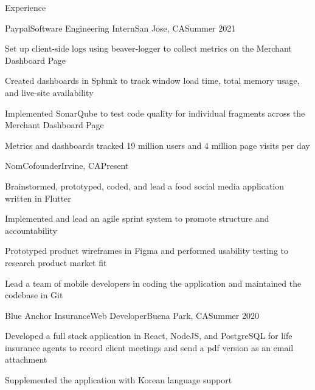 \documentclass{article}
\newlength{\tabin}
\newlength{\secsep}
\newcommand{\lineunder}{\vspace*{-8pt} \\ \hspace*{-6pt} \hrulefill \\ \vspace*{-15pt}}
\newenvironment{tabbedsection}[1]{
  \begin{list}{}{
      \setlength{\itemsep}{0pt}
      \setlength{\labelsep}{0pt}
      \setlength{\labelwidth}{0pt}
      \setlength{\leftmargin}{\tabin}
      \setlength{\rightmargin}{\tabin}
      \setlength{\listparindent}{0pt}
      \setlength{\parsep}{0pt}
      \setlength{\parskip}{0pt}
      \setlength{\partopsep}{0pt}
      \setlength{\topsep}{#1}
    }
  \item[]
}{\end{list}}
\newenvironment{resume_section}[1]{
  \filbreak
  \vspace{2\secsep}
  \textsc{\large#1}
  \lineunder
  \begin{tabbedsection}{\secsep}
}{\end{tabbedsection}}
\newenvironment{subitems}{
  \renewcommand{\labelitemi}{-}
  \begin{itemize}
      \setlength{\labelsep}{1em}
}{\end{itemize}}
\newenvironment{resume_employer}[4]{
  \vspace{\secsep}
  \textbf{#1} \\ 
  \indent {\small #2} \hfill {\footnotesize#3 (#4)}
  \begin{tabbedsection}{0pt}
  \begin{subitems}
}{\end{subitems}\end{tabbedsection}}
\begin{document}
\begin{resume_section}{Experience}
  \begin{resume_employer}{Paypal}{Software Engineering Intern}{San Jose, CA}{Summer 2021}
    \item Set up client-side logs using beaver-logger to collect metrics on the Merchant Dashboard Page
    \item Created dashboards in Splunk to track window load time, total memory usage, and live-site availability
    \item Implemented SonarQube to test code quality for individual fragments across the Merchant Dashboard Page
    \item Metrics and dashboards tracked 19 million users and 4 million page visits per day
  \end{resume_employer}
   \begin{resume_employer}{Nom}{Cofounder}{Irvine, CA}{Present}
    \item Brainstormed, prototyped, coded, and lead a food social media application written in Flutter
    \item Implemented and lead an agile sprint system to promote structure and accountability
    \item Prototyped product wireframes in Figma and performed usability testing to research product market fit
    \item Lead a team of mobile developers in coding the application and maintained the codebase in Git
  \end{resume_employer}
  \begin{resume_employer}{Blue Anchor Insurance}{Web Developer}{Buena Park, CA}{Summer 2020}
    \item Developed a full stack application in React, NodeJS, and PostgreSQL for life insurance agents to record client meetings and send a pdf version as an email attachment
    \item Supplemented the application with Korean language support
  \end{resume_employer}
\end{resume_section}
\end{document}
